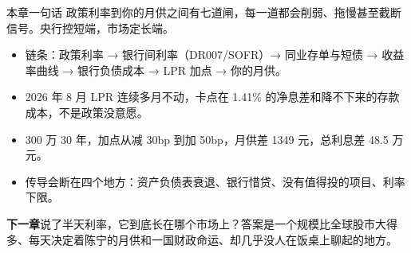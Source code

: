\begin{takeaway}{本章一句话}
政策利率到你的月供之间有七道闸，每一道都会削弱、拖慢甚至截断信号。央行控短端，市场定长端。

\begin{itemize}
  \item 链条：政策利率 → 银行间利率（DR007/SOFR）→ 同业存单与短债 → 收益率曲线 → 银行负债成本 → LPR 加点 → 你的月供。
  \item 2026 年 8 月 LPR 连续多月不动，卡点在 1.41\% 的净息差和降不下来的存款成本，不是政策没意愿。
  \item 300 万 30 年，加点从减 30bp 到加 50bp，月供差 1349 元，总利息差 48.5 万元。
  \item 传导会断在四个地方：资产负债表衰退、银行惜贷、没有值得投的项目、利率下限。
\end{itemize}

\end{takeaway}

\begin{bridgebox}
\textbf{下一章}说了半天利率，它到底长在哪个市场上？答案是一个规模比全球股市大得多、每天决定着陈宁的月供和一国财政命运、却几乎没人在饭桌上聊起的地方。
\end{bridgebox}

